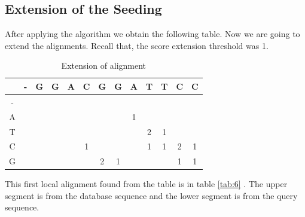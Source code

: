 \documentclass[12pt, a4paper]{report}
\begin{document}
\subsection{Extension of the Seeding}
 After applying the algorithm we obtain the following table. Now we are going to extend the alignments. Recall that, the score extension threshold was 1. \\
 
\begin{table}[h]
    \centering
    \renewcommand{\arraystretch}{1}
    
    \begin{tabular}{| c | c | c | c | c | c | c | c | c | c | c | c | c |}
        \hline
        & - & G & G & A & C   &   G   &   G   &   A   &   T   &   T   &   C   &   C  \\
        \hline
        - & &  &  &  &   &   &   &    &     &    &     &    \\
        \hline
        A & &  &   &  &   &  &   &  1  &    &    &   &   \\
        \hline
        T & & &   &  &   &  &   &   &   2  & 1  &   &   \\
        \hline
        C &  & &   &  & 1  &  &   &    &  1 &  1 & 2  &  1 \\
        \hline
        G &  & &  &  &   & 2 &  1 &    &    &    &  1 &  1 \\
        \hline
    \end{tabular}
    \caption{Extension of alignment}
    \label{tab:5}
\end{table}

This first local alignment found from the table is in table \ref{tab:6} . The upper segment is from the database sequence and the lower segment is from the query sequence. \\
\end{document}
